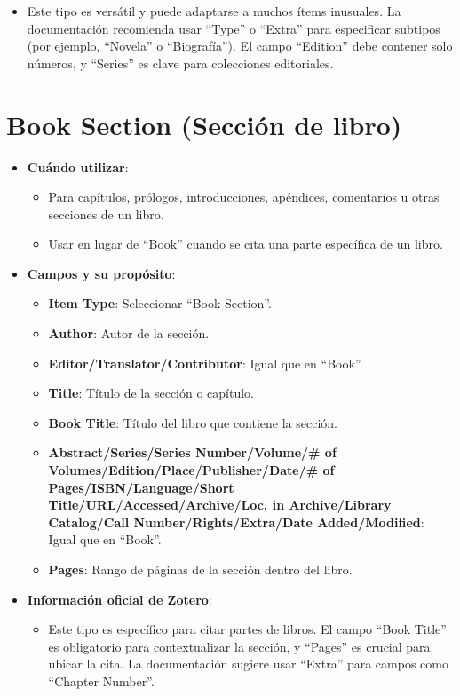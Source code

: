 \documentclass[
  jou,
  floatsintext,
  longtable,
  a4paper,
  nolmodern,
  notxfonts,
  notimes,
  12pt,
  colorlinks=true,linkcolor=blue,citecolor=blue,urlcolor=blue]{apa7}
\providecommand{\tightlist}{%
  \setlength{\itemsep}{0pt}\setlength{\parskip}{0pt}}
\begin{document}
\begin{itemize}
  \begin{itemize}
  \tightlist
  \item
    Este tipo es versátil y puede adaptarse a muchos ítems inusuales. La
    documentación recomienda usar ``Type'' o ``Extra'' para especificar
    subtipos (por ejemplo, ``Novela'' o ``Biografía''). El campo
    ``Edition'' debe contener solo números, y ``Series'' es clave para
    colecciones editoriales.
  \end{itemize}
\end{itemize}

\section{Book Section (Sección de
libro)}\label{book-section-secciuxf3n-de-libro}

\begin{itemize}
\tightlist
\item
  \textbf{Cuándo utilizar}:

  \begin{itemize}
  \tightlist
  \item
    Para capítulos, prólogos, introducciones, apéndices, comentarios u
    otras secciones de un libro.
  \item
    Usar en lugar de ``Book'' cuando se cita una parte específica de un
    libro.
  \end{itemize}
\item
  \textbf{Campos y su propósito}:

  \begin{itemize}
  \tightlist
  \item
    \textbf{Item Type}: Seleccionar ``Book Section''.
  \item
    \textbf{Author}: Autor de la sección.
  \item
    \textbf{Editor/Translator/Contributor}: Igual que en ``Book''.
  \item
    \textbf{Title}: Título de la sección o capítulo.
  \item
    \textbf{Book Title}: Título del libro que contiene la sección.
  \item
    \textbf{Abstract/Series/Series Number/Volume/\# of
    Volumes/Edition/Place/Publisher/Date/\# of Pages/ISBN/Language/Short
    Title/URL/Accessed/Archive/Loc. in Archive/Library Catalog/Call
    Number/Rights/Extra/Date Added/Modified}: Igual que en ``Book''.
  \item
    \textbf{Pages}: Rango de páginas de la sección dentro del libro.
  \end{itemize}
\item
  \textbf{Información oficial de Zotero}:

  \begin{itemize}
  \tightlist
  \item
    Este tipo es específico para citar partes de libros. El campo ``Book
    Title'' es obligatorio para contextualizar la sección, y ``Pages''
    es crucial para ubicar la cita. La documentación sugiere usar
    ``Extra'' para campos como ``Chapter Number''.
  \end{itemize}
\end{itemize}
\end{document}
